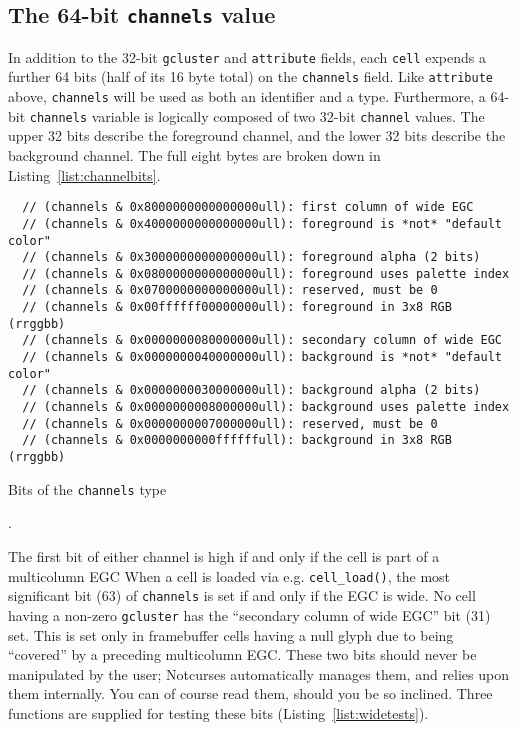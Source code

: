\subsection{The 64-bit \texttt{channels} value}
\label{sec:channels}
In addition to the 32-bit \texttt{gcluster} and \texttt{attribute} fields, each
\texttt{cell} expends a further 64 bits (half of its 16 byte total) on the
\texttt{channels} field. Like \texttt{attribute} above, \texttt{channels} will
be used as both an identifier and a type. Furthermore, a 64-bit \texttt{channels}
variable is logically composed of two 32-bit \texttt{channel} values. The upper
32 bits describe the foreground channel, and the lower 32 bits describe the
background channel. The full eight bytes are broken down in Listing~\ref{list:channelbits}.

\begin{listing}[!htb]
\begin{verbatim}
  // (channels & 0x8000000000000000ull): first column of wide EGC
  // (channels & 0x4000000000000000ull): foreground is *not* "default color"
  // (channels & 0x3000000000000000ull): foreground alpha (2 bits)
  // (channels & 0x0800000000000000ull): foreground uses palette index
  // (channels & 0x0700000000000000ull): reserved, must be 0
  // (channels & 0x00ffffff00000000ull): foreground in 3x8 RGB (rrggbb)
  // (channels & 0x0000000080000000ull): secondary column of wide EGC
  // (channels & 0x0000000040000000ull): background is *not* "default color"
  // (channels & 0x0000000030000000ull): background alpha (2 bits)
  // (channels & 0x0000000008000000ull): background uses palette index
  // (channels & 0x0000000007000000ull): reserved, must be 0
  // (channels & 0x0000000000ffffffull): background in 3x8 RGB (rrggbb)
\end{verbatim}
\caption{Bits of the \texttt{channels} type}.
\label{list:channelbits}
\end{listing}

The first bit of either channel is high if and only if the cell is part of a
multicolumn EGC When a cell is loaded via e.g. \texttt{cell\_load()}, the most
significant bit (63) of \texttt{channels} is set if and only if the EGC is wide. No
cell having a non-zero \texttt{gcluster} has the ``secondary column of wide EGC''
bit (31) set. This is set only in framebuffer cells having a null glyph due to
being ``covered'' by a preceding multicolumn EGC. These two bits should never
be manipulated by the user; Notcurses automatically manages them, and relies upon
them internally. You can of course read them, should you be so inclined. Three
functions are supplied for testing these bits (Listing~\ref{list:widetests}).

